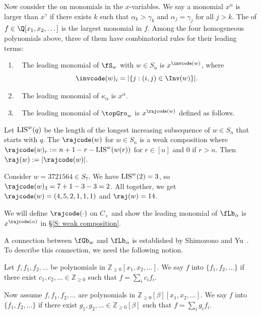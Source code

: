 Now consider the  
on monomials in the $x$-variables.
We say a monomial $x^\alpha$ is larger than $x^\gamma$
if there exists $k$ such that $\alpha_k > \gamma_k$ and 
$\alpha_j = \gamma_j$ for all $j > k$.
The  of $f \in \Q[x_1, x_2, \dots]$
is the largest monomial in $f$. 
Among the four homogeneous
polynomials above,
three of them have combinatorial rules for their leading terms:
\begin{enumerate}
\item~\cite{BJS} The leading monomial of $\fS_w$ with $w \in S_n$
is $x^{\invcode(w)}$,
where $$\invcode(w)_i = |\{j: (i,j) \in \Inv(w)\}|.$$
\item~\cite{LS2} The leading monomial of $\kappa_\alpha$ is $x^\alpha$.
\item~\cite{PSW} The leading monomial of $\topGro_w$
is $x^{\rajcode(w)}$ defined as follows.
\end{enumerate}

\begin{defn}\cite{PSW}
\label{D: raj on permutations}
Let $\textup{LIS}^w(q)$ be the 
length of the longest increasing subsequence 
of $w\in S_n$ that starts with $q$.
The $\rajcode(w)$ for $w\in S_n$ is a weak composition
where 
$\rajcode(w)_r := n + 1 - r - \textup{LIS}^w(w(r))$ for $r \in [n]$
and $0$ if $r > n$.
Then $\raj(w) := |\rajcode(w)|$.
\end{defn}


\begin{exa}
\label{E: rajcode permutation}
Consider $w = 3721564 \in S_7$. We have $\textup{LIS}^w(2) = 3$, 
so $\rajcode(w)_3 = 7 + 1 - 3 - 3 = 2$.
All together,
we get $\rajcode(w) = (4,5,2,1,1,1)$ and $\raj(w) = 14$.
\end{exa}

We will define $\rajcode(\cdot)$ on $C_+$
and show the leading monomial of $\fLb_\alpha$ is $x^{\rajcode(\alpha)}$
in \S\ref{S: weak composition}.

A connection between $\fGb_w$ and $\fLb_\alpha$
is established by Shimozono and Yu~\cite{SY}.
To describe this connection, 
we need the following notion.
\begin{defn}
Let $f, f_1, f_2, \dots$ be polynomials in 
$\mathbb{Z}_{\geq 0}[x_1, x_2,\dots]$.
We say $f$  
into $\{f_1,f_2, \dots\}$ if there exist 
$c_1,c_2, \dots \in \mathbb{Z}_{\geq 0}$
such that $f = \sum_{i} c_if_i$.

Now assume $f, f_1, f_2, \dots$ are polynomials 
in $\mathbb{Z}_{ \geq 0}[\beta][x_1, x_2,\dots]$.
We say $f$  
into $\{f_1,f_2, \dots\}$ if there exist 
$g_1,g_2, \dots \in \mathbb{Z}_{\geq 0}[\beta]$ 
such that $f = \sum_{i} g_if_i$.
\end{defn}

